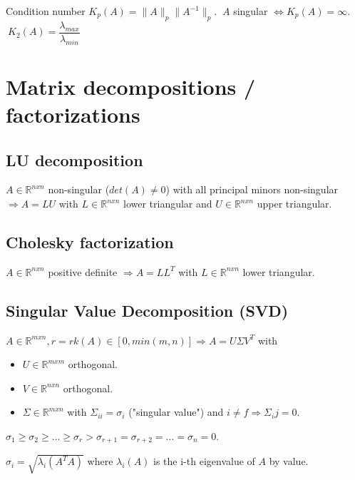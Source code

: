 \documentclass[]{article}
\begin{document}
	Condition number $K_p(A) = \lVert A \rVert_p \lVert A^{-1} \rVert_p$.  $\ A$ singular $\Leftrightarrow K_p(A) = \infty$. $\ K_2(A) = \dfrac{\lambda_{max}}{\lambda_{min}}$
	
	
	
	\section{Matrix decompositions / factorizations}
	
	\subsection{LU decomposition}
	
	$A \in \mathbb{R}^{nxn} $ non-singular ($det(A)\ne0$) with all principal minors non-singular $\Rightarrow A = L U$ with $L \in \mathbb{R}^{nxn}$ lower triangular and $U \in \mathbb{R}^{nxn}$ upper triangular.
	
	\subsection{Cholesky factorization}
	
	$A \in \mathbb{R}^{nxn} $ positive definite $\Rightarrow A = L L^T$ with $L \in \mathbb{R}^{nxn}$ lower triangular.
	
	\subsection{Singular Value Decomposition (SVD)}
	
	$A \in \mathbb{R}^{mxn}, r = rk(A)\in[0,min(m,n)] \Rightarrow A = U \Sigma V^T$ with 
	\begin{itemize}
		\item $U\in\mathbb{R}^{mxm}$ orthogonal.
		\item $V\in\mathbb{R}^{nxn}$ orthogonal.
		\item $\Sigma \in\mathbb{R}^{mxn}$ with $\Sigma_{ii}=\sigma_i$ ("singular value") and $i \ne f \Rightarrow \Sigma_ij=0$.
	\end{itemize}
	$\sigma_1 \ge \sigma_2 \ge \ldots \ge \sigma_r > \sigma_{r+1} = \sigma_{r+2} = \ldots = \sigma_n = 0$.

	$\sigma_i = \sqrt{\lambda_i(A^T A)}$ where $\lambda_i(A)$ is the i-th eigenvalue of $A$ by value.
	
\end{document}
